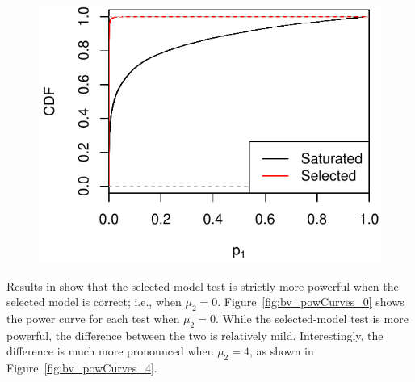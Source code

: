 \documentclass{article}
\begin{document}
\begin{figure}
  \centering
  \includegraphics[width=.5\textwidth]{figs/bivariateSelVSat_rocCurve.pdf}
  \caption{}
  \label{fig:bv_rocCurve}
\end{figure}

Results in \citet{fithian2014optimal} show that the selected-model test is strictly more powerful when the selected model is correct; i.e., when $\mu_2=0$. Figure~\ref{fig:bv_powCurves_0} shows the power curve for each test when $\mu_2=0$. While the selected-model test is more powerful, the difference between the two is relatively mild. Interestingly, the difference is much more pronounced when $\mu_2=4$, as shown in Figure~\ref{fig:bv_powCurves_4}.
\end{document}
